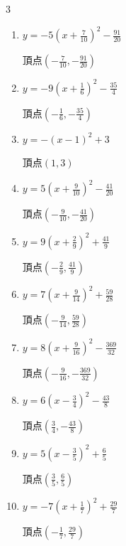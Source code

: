 \begin{multicols}{3}
\begin{enumerate}
  \item $\displaystyle y=-5\left( x+\frac{7}{10}\right)^{2}-\frac{91}{20}$

        $\displaystyle 頂点\left( -\frac{7}{10} , -\frac{91}{20} \right)$

\columnbreak %

  \item $\displaystyle y=-9\left( x+\frac{1}{6}\right)^{2}-\frac{35}{4}$

        $\displaystyle 頂点\left( -\frac{1}{6} , -\frac{35}{4} \right)$

  \item $\displaystyle y=-\left( x-1\right)^{2}+3$

        $\displaystyle 頂点\left( 1 , 3 \right)$

  \item $\displaystyle y=5\left( x+\frac{9}{10}\right)^{2}-\frac{41}{20}$

        $\displaystyle 頂点\left( -\frac{9}{10} , -\frac{41}{20} \right)$

  \item $\displaystyle y=9\left( x+\frac{2}{9}\right)^{2}+\frac{41}{9}$

        $\displaystyle 頂点\left( -\frac{2}{9} , \frac{41}{9} \right)$

  \item $\displaystyle y=7\left( x+\frac{9}{14}\right)^{2}+\frac{59}{28}$

        $\displaystyle 頂点\left( -\frac{9}{14} , \frac{59}{28} \right)$

  \item $\displaystyle y=8\left( x+\frac{9}{16}\right)^{2}-\frac{369}{32}$

        $\displaystyle 頂点\left( -\frac{9}{16} , -\frac{369}{32} \right)$

  \item $\displaystyle y=6\left( x-\frac{3}{4}\right)^{2}-\frac{43}{8}$

        $\displaystyle 頂点\left( \frac{3}{4} , -\frac{43}{8} \right)$

  \item $\displaystyle y=5\left( x-\frac{3}{5}\right)^{2}+\frac{6}{5}$

        $\displaystyle 頂点\left( \frac{3}{5} , \frac{6}{5} \right)$

  \item $\displaystyle y=-7\left( x+\frac{1}{7}\right)^{2}+\frac{29}{7}$

        $\displaystyle 頂点\left( -\frac{1}{7} , \frac{29}{7} \right)$


\end{enumerate}
\end{multicols}
